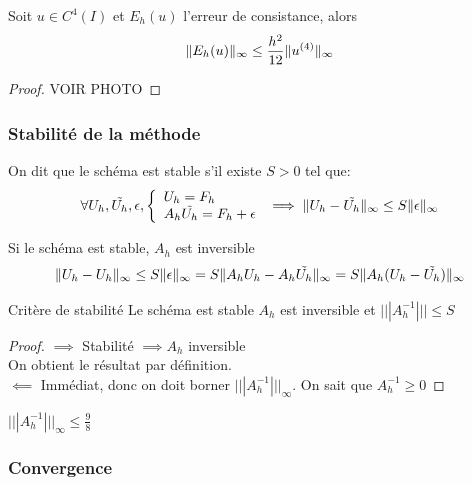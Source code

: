 \documentclass[]{report}
\begin{document}
    \begin{tm}{}{}
        Soit $u\in C^4(I)$ et $E_h(u)$ l'erreur de consistance, alors
        \[\lVert E_h(u) \rVert_\infty\le \frac{h^2}{12}\lVert u^{(4)} \rVert_\infty\]
    \end{tm}

    \begin{proof}
        VOIR PHOTO
    \end{proof}

    \subsubsection*{Stabilité de la méthode}

    \begin{df}{}{}
        On dit que le schéma est stable s'il existe $S>0$ tel que:
        \[\forall U_h,\tilde{U_h},\epsilon,\left\{\begin{array}{ll} U_h=F_h\\ A_h \tilde{U_h}=F_h+\epsilon \end{array} \right.\implies \lVert U_h-\tilde{U_h} \rVert_\infty\le S\lVert \epsilon \rVert_\infty\]
    \end{df}

    \begin{re}{}{}
        Si le schéma est stable, $A_h$ est inversible
        \begin{align*}
            \lVert U_h-U_h \rVert_\infty\le S\lVert \epsilon \rVert_\infty=S\lVert A_hU_h-A_h\tilde{U_h} \rVert_\infty=S\lVert A_h(U_h-\tilde{U_h}) \rVert_\infty
        \end{align*}
    \end{re}

    \begin{lm}{Critère de stabilité}{}
        Le schéma est stable \ssi $A_h$ est inversible et $|||A_h^{-1}|||\le S$
    \end{lm}

    \begin{proof}
        $\implies$ Stabilité $\implies A_h$ inversible\\
        On obtient le résultat par définition.\\
        $\impliedby$ Immédiat, donc on doit borner $|||A_h^{-1}|||_\infty$. On sait que $A_h^{-1}\ge 0$
    \end{proof}

    \begin{lm}{}{}
        $|||A_h^{-1}|||_\infty\le \frac{9}{8}$
    \end{lm}

    \subsubsection*{Convergence}
\end{document}

